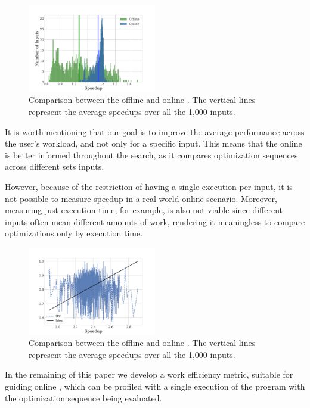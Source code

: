 \begin{figure}[ht]
    \centering
    \includegraphics[width=0.5\textwidth]{figs/motivation-online.pdf}
    \caption{Comparison between the offline and online {\itercomp}.
             The vertical lines represent the average speedups over
             all the 1,000 inputs.
             }
    \label{fig:motivation-online}
\end{figure}

It is worth mentioning that our goal is to improve the average performance
across the user's workload, and not only for a specific input.
This means that the online {\itercomp} is better informed throughout the search,
as it compares optimization sequences across different sets inputs.

However, because of the restriction of having a single execution per input,
it is not possible to measure speedup in a real-world online scenario.
Moreover, measuring just execution time, for example, is also not viable since
different inputs often mean different amounts of work,
rendering it meaningless to compare optimizations only by execution time.


\begin{figure}[ht]
    \centering
    \includegraphics[width=0.5\textwidth]{figs/motivation-metric.pdf}
    \caption{Comparison between the offline and online {\itercomp}.
             The vertical lines represent the average speedups over
             all the 1,000 inputs.
             }
    \label{fig:motivation-metric}
\end{figure}

In the remaining of this paper we develop a work efficiency metric, suitable
for guiding online {\itercomp}, which can be profiled with a single execution
of the program with the optimization sequence being evaluated.

